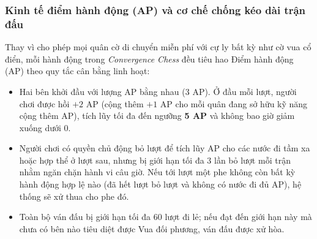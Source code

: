 \subsubsection{Kinh tế điểm hành động (AP) và cơ chế chống kéo dài trận đấu}
Thay vì cho phép mọi quân cờ di chuyển miễn phí với cự ly bất kỳ như cờ vua cổ điển, mỗi hành động trong \textit{Convergence Chess} đều tiêu hao Điểm hành động (AP) theo quy tắc cân bằng linh hoạt:
\begin{itemize}
    \item Hai bên khởi đầu với lượng AP bằng nhau ($3$ AP). Ở đầu mỗi lượt, người chơi được hồi $+2$ AP (cộng thêm $+1$ AP cho mỗi quân đang sở hữu kỹ năng cộng thêm AP), tích lũy tối đa đến ngưỡng \textbf{5 AP} và không bao giờ giảm xuống dưới $0$.
    \item Người chơi có quyền chủ động bỏ lượt để tích lũy AP cho các nước đi tầm xa hoặc hợp thể ở lượt sau, nhưng bị giới hạn tối đa $3$ lần bỏ lượt mỗi trận nhằm ngăn chặn hành vi câu giờ. Nếu tới lượt một phe không còn bất kỳ hành động hợp lệ nào (đã hết lượt bỏ lượt và không có nước đi đủ AP), hệ thống sẽ xử thua cho phe đó.
    \item Toàn bộ ván đấu bị giới hạn tối đa $60$ lượt đi lẻ; nếu đạt đến giới hạn này mà chưa có bên nào tiêu diệt được Vua đối phương, ván đấu được xử hòa.
\end{itemize}

